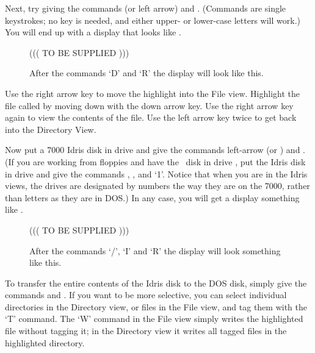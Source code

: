 Next, try giving the commands  (or left arrow) 
and .
(Commands are single keystrokes; no  key is needed, and
either upper- or lower-case letters will work.)  You will end up with
a display that looks like .
 
\begin{figure}[tbp]

\vspace{1.25in}
((( TO BE SUPPLIED )))
\vspace{1.25in}
 
\caption{After the commands `D' and `R' the display will look
like this.}
\label{fig-after-read}
\end{figure}
 
Use the right arrow key to move the highlight into the File view. 
Highlight the file called  by moving down with the 
down arrow key.  Use the right arrow key again to view the contents
of the file.  Use the left arrow key twice to get back
into the Directory View.
 
Now put a 7000 Idris disk in drive  and give the commands
left-arrow (or ) and .  (If you are working from
floppies and have the \RD\ disk in drive , put the Idris
disk in drive  and give the commands , ,
and `1'.  Notice that when you are in the Idris views,
the drives are designated by numbers the way they are on the 7000,
rather than letters as they are in DOS.)  In any case, you will
get a display something like .
 
\begin{figure}[tbp]
 
\vspace{1.25in}
((( TO BE SUPPLIED )))
\vspace{1.25in}
 
\caption{After the commands `/', `I' and `R' the display will look
something like this.}
\label{fig-idris}
\end{figure}
 
To transfer the entire contents of the Idris disk to the DOS disk,
simply give the commands  and .
If you want to be more selective, you can select
individual directories in the Directory view, or files in the File
view, and tag them with the `T' command.  The `W' command in the
File view simply writes the highlighted file without tagging it; in
the Directory view it writes all tagged files in the highlighted
directory.
 
